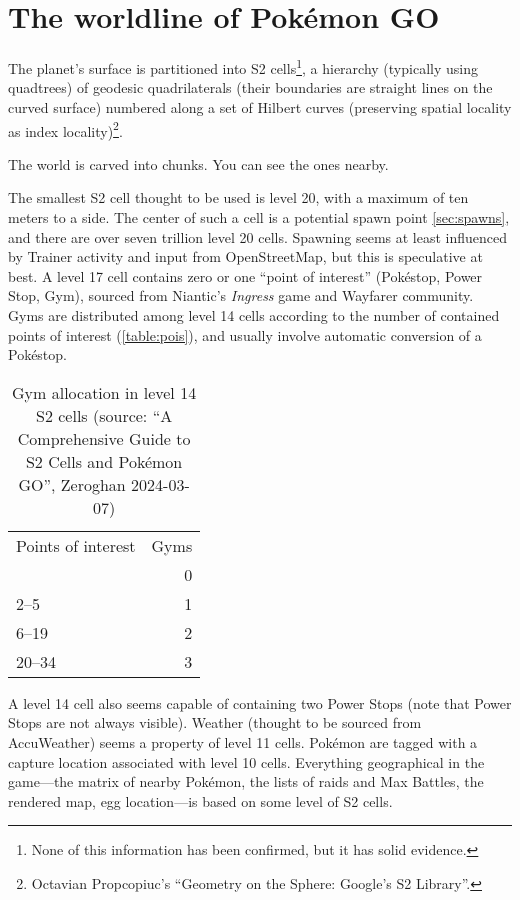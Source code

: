 \section{The worldline of Pokémon GO\label{sec:world}}
The planet's surface is partitioned into S2 cells\footnote{None of this information has been confirmed, but it has solid evidence.}, a hierarchy (typically using
 quadtrees) of geodesic quadrilaterals (their boundaries are straight lines on the curved
 surface) numbered along a set of Hilbert curves (preserving spatial locality as index locality)\footnote{Octavian Propcopiuc's ``Geometry on the Sphere: Google's S2 Library''.}.
\begin{tipbox}[title=If that meant nothing to you…]
The world is carved into chunks. You can see the ones nearby.
\end{tipbox}
The smallest S2 cell thought to be used is level 20, with a maximum of ten meters to a side.
The center of such a cell is a potential spawn point \autoref{sec:spawns}, and there are over seven trillion level 20 cells.
Spawning seems at least influenced by Trainer activity and input from OpenStreetMap, but this is speculative at best.
A level 17 cell contains zero or one ``point of interest'' (Pokéstop, Power Stop, Gym),
 sourced from Niantic's \textit{Ingress} game and Wayfarer community.
Gyms are distributed among level 14 cells according to the number of contained points of interest (\autoref{table:pois}),
 and usually involve automatic conversion of a Pokéstop.
\begin{table}
\centering
\begin{tabular}{lr}
Points of interest & Gyms\\
\Midrule
1 & 0 \\
2--5 & 1\\
6--19 & 2\\
20--34 & 3\\
\end{tabular}
\caption[Gym allocation in level 14 S2 cells]{Gym allocation in level 14 S2 cells (source: ``A Comprehensive Guide to S2 Cells and Pokémon GO'', Zeroghan 2024-03-07)\label{table:pois}}
\end{table}
A level 14 cell also seems capable of containing two Power Stops (note that Power Stops are not always visible).
 Weather (thought to be sourced from AccuWeather) seems a property of level 11 cells.
Pokémon are tagged with a capture location associated with level 10 cells.
Everything geographical in the game---the matrix of nearby Pokémon, the lists
 of raids and Max Battles, the rendered map, egg location---is based on some level of S2 cells.
